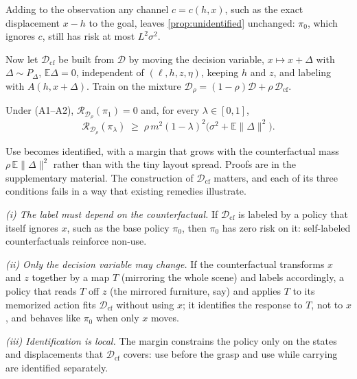 \begin{corollary}
\label{cor:info}
Adding to the observation any channel $c=c(h,x)$, such as the exact displacement $x-h$ to the goal, leaves
\cref{prop:unidentified} unchanged: $\pi_0$, which ignores $c$, still has risk at most $L^2\sigma^2$.
\end{corollary}

Now let $\mathcal{D}_{\text{cf}}$ be built from $\mathcal{D}$ by moving the decision variable,
$x\mapsto x+\Delta$ with $\Delta\sim P_\Delta$, $\mathbb{E}\Delta=0$, independent of $(\ell,h,z,\eta)$, keeping $h$ and $z$, and
labeling with
$A(h,x+\Delta)$. Train on the mixture $\mathcal{D}_\rho=(1-\rho)\mathcal{D}+\rho\,\mathcal{D}_{\text{cf}}$.

\begin{proposition}
\label{prop:identified}
Under (A1--A2), $\mathcal{R}_{\mathcal{D}_\rho}(\pi_1)=0$ and, for every $\lambda\in[0,1]$,
\begin{equation}
\mathcal{R}_{\mathcal{D}_\rho}(\pi_\lambda)\;\ge\;\rho\,m^2(1-\lambda)^2\big(\sigma^2+\mathbb{E}\lVert\Delta\rVert^2\big).
\end{equation}
\end{proposition}

Use becomes identified, with a margin that grows with the counterfactual mass $\rho\,\mathbb{E}\lVert\Delta\rVert^2$ rather
than with the tiny layout spread.
Proofs are in the supplementary material.
The construction of $\mathcal{D}_{\text{cf}}$ matters, and each of its three conditions fails in a way that existing remedies
illustrate.

\emph{(i) The label must depend on the counterfactual.}
If $\mathcal{D}_{\text{cf}}$ is labeled by a policy that itself ignores $x$, such as the base policy $\pi_0$, then $\pi_0$
has zero risk on it: self-labeled counterfactuals reinforce non-use.

\emph{(ii) Only the decision variable may change.}
If the counterfactual transforms $x$ and $z$ together by a map $T$ (mirroring the whole scene) and labels accordingly,
a policy that reads $T$ off $z$ (the mirrored furniture, say) and applies $T$ to its memorized action fits
$\mathcal{D}_{\text{cf}}$ without using $x$; it identifies the response to $T$, not to $x$, and behaves like $\pi_0$ when only
$x$ moves.

\emph{(iii) Identification is local.}
The margin constrains the policy only on the states and displacements that $\mathcal{D}_{\text{cf}}$ covers: use before the
grasp and use while carrying are identified separately.

